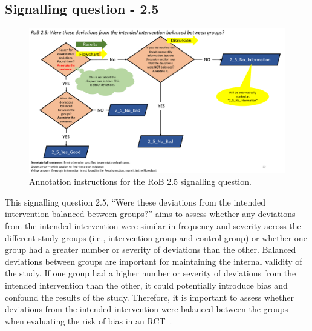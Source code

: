 \documentclass[sn-mathphys,Numbered]{sn-jnl}%
\begin{document}
\subsection*{Signalling question - 2.5 }
%
%
%
\begin{figure}[hbt]
    \centering
    \includegraphics[width=\textwidth]{figures/2_5.pdf}
    \caption{Annotation instructions for the RoB 2.5 signalling question.}
    \label{fig:2_5}
\end{figure}
%
%
%
This signalling question 2.5, ``Were these deviations from the intended intervention balanced between groups?'' aims to assess whether any deviations from the intended intervention were similar in frequency and severity across the different study groups (i.e., intervention group and control group) or whether one group had a greater number or severity of deviations than the other.
Balanced deviations between groups are important for maintaining the internal validity of the study.
If one group had a higher number or severity of deviations from the intended intervention than the other, it could potentially introduce bias and confound the results of the study.
Therefore, it is important to assess whether deviations from the intended intervention were balanced between the groups when evaluating the risk of bias in an RCT~\cite{rozenfeld2006effect}.
\end{document}
